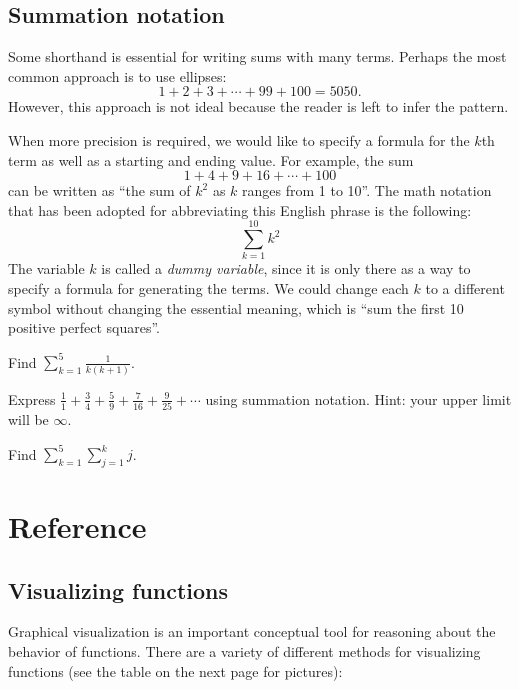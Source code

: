\documentclass{watsonbook}
\begin{document}
\subsection{Summation notation}

Some shorthand is essential for writing sums with many terms. Perhaps
the most common approach is to use ellipses:
\[
  1 + 2  + 3 + \cdots + 99 + 100 = 5050. 
\]
However, this approach is not ideal because the reader is left to
infer the pattern.

When more precision is required, we would like to specify a formula
for the $k$th term as well as a starting and ending value. For
example, the sum
\[
  1 + 4 + 9 + 16 + \cdots + 100
\]
can be written as ``the sum of $k^2$ as $k$ ranges from 1 to
10''. The math notation that has been adopted for abbreviating this
English phrase is the following:
\[
  \sum_{k=1}^{10} k^2 
\]
The variable $k$ is called a \textit{dummy variable}, since it is
only there as a way to specify a formula for generating the
terms. We could change each $k$ to a different symbol without
changing the essential meaning, which is ``sum the first 10 positive
perfect squares''.

\begin{exercise}{}{}
  Find $\displaystyle{\sum_{k=1}^5\frac{1}{k(k+1)}}$. 
\end{exercise}

\begin{exercise}{}{}
  Express
  $\tfrac{1}{1} + \tfrac{3}{4} + \tfrac{5}{9} + \tfrac{7}{16} +
  \tfrac{9}{25} + \cdots$ using summation notation. Hint: your upper
  limit will be $\infty$.
\end{exercise}

\begin{exercise}{}{}
  Find $\displaystyle{\sum_{k=1}^5\sum_{j=1}^k j }$. 
\end{exercise}

\newpage

\section{Reference} 

\subsection{Visualizing functions}

Graphical visualization is an important conceptual tool for reasoning
about the behavior of functions. There are a variety of different
methods for visualizing functions (see the table on the next page
for pictures):
\end{document}
